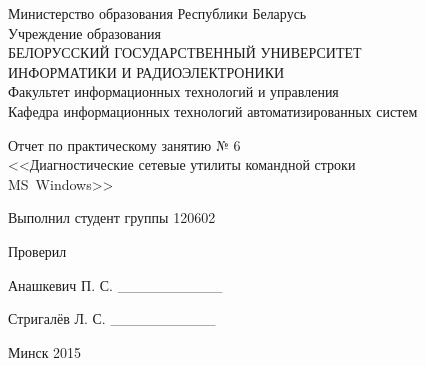 \thispagestyle{empty}
\setlength{\parindent}{0ex} %

\begin{center}
  Министерство образования Республики Беларусь \\
  \vspace{0.5ex}
  Учреждение образования \\
  БЕЛОРУССКИЙ ГОСУДАРСТВЕННЫЙ УНИВЕРСИТЕТ \\
  ИНФОРМАТИКИ И РАДИОЭЛЕКТРОНИКИ \\
  \vspace{0.5ex}
  Факультет информационных технологий и управления \\
  \vspace{0.5ex}
  Кафедра информационных технологий автоматизированных систем
\end{center}

\vspace{50mm}

\begin{center}
  Отчет по практическому занятию № 6 \\
  <<Диагностические сетевые утилиты командной строки \\ MS~Windows>>
\end{center}

\vspace{55mm}

\begin{minipage}{.55\linewidth}
    Выполнил студент группы 120602

    \smallskip

    Проверил
\end{minipage}
\hfill
\begin{minipage}{.4\linewidth}
  \begin{flushright}
    Анашкевич П. С. \_\_\_\_\_\_\_\_\_\_

    \smallskip

    Стригалёв Л. С. \_\_\_\_\_\_\_\_\_\_
  \end{flushright}
\end{minipage}

\vspace{45mm}
\begin{center}
  Минск 2015
\end{center}

\setlength{\parindent}{1.25cm} %

\newpage
